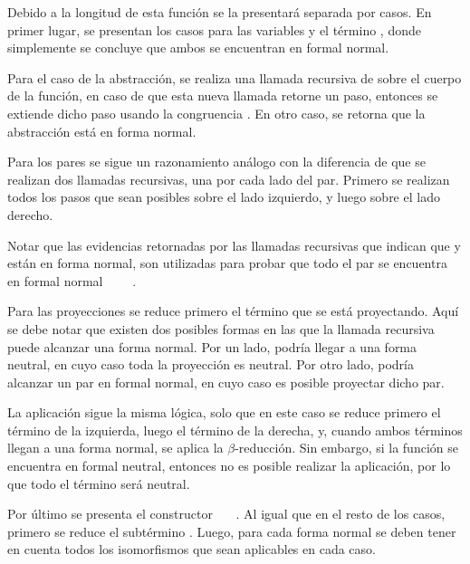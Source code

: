 Debido a la longitud de esta función se la presentará separada por casos.
En primer lugar, se presentan los casos para las variables y el término \const{$\star$}, donde simplemente se concluye que ambos se encuentran en formal normal.


Para el caso de la abstracción, se realiza una llamada recursiva de  sobre el cuerpo de la función, en caso de que esta nueva llamada retorne un paso, entonces se extiende dicho paso usando la congruencia \const{$\zeta$}.
En otro caso, se retorna que la abstracción está en forma normal.


Para los pares se sigue un razonamiento análogo con la diferencia de que se realizan dos llamadas recursivas, una por cada lado del par.
Primero se realizan todos los pasos que sean posibles sobre el lado izquierdo, y luego sobre el lado derecho.


Notar que las evidencias retornadas por las llamadas recursivas que indican que  y  están en forma normal, son utilizadas para probar que todo el par se encuentra en formal normal ~~\const{,}~~\const{$\rangle$}.

Para las proyecciones se reduce primero el término que se está proyectando.
Aquí se debe notar que existen dos posibles formas en las que la llamada recursiva puede alcanzar una forma normal.
Por un lado, podría llegar a una forma neutral, en cuyo caso toda la proyección es neutral.
Por otro lado, podría alcanzar un par en formal normal, en cuyo caso es posible proyectar dicho par.


La aplicación sigue la misma lógica, solo que en este caso se reduce primero el término de la izquierda, luego el término de la derecha, y, cuando ambos términos llegan a una forma normal, se aplica la $\beta$-reducción.
Sin embargo, si la función se encuentra en formal neutral, entonces no es posible realizar la aplicación, por lo que todo el término será neutral.


Por último se presenta el constructor \const{[}~~\const{]≡}~.
Al igual que en el resto de los casos, primero se reduce el subtérmino .
Luego, para cada forma normal se deben tener en cuenta todos los isomorfismos que sean aplicables en cada caso.

